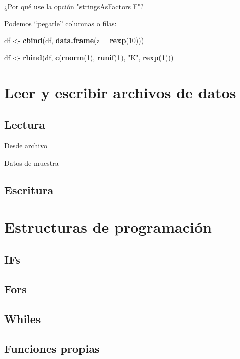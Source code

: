 \documentclass[]{article}
\newenvironment{Shaded}{\begin{snugshade}}{\end{snugshade}}
\newcommand{\KeywordTok}[1]{\textcolor[rgb]{0.13,0.29,0.53}{\textbf{{#1}}}}
\newcommand{\DataTypeTok}[1]{\textcolor[rgb]{0.13,0.29,0.53}{{#1}}}
\newcommand{\DecValTok}[1]{\textcolor[rgb]{0.00,0.00,0.81}{{#1}}}
\newcommand{\StringTok}[1]{\textcolor[rgb]{0.31,0.60,0.02}{{#1}}}
\newcommand{\NormalTok}[1]{{#1}}
\begin{document}
\begin{curiosidad}
¿Por qué use la opción "stringsAsFactors \= F"?
\end{curiosidad}

Podemos ``pegarle'' columnas o filas:

\begin{Shaded}
\begin{Highlighting}[]
\NormalTok{df <-}\StringTok{ }\KeywordTok{cbind}\NormalTok{(df, }\KeywordTok{data.frame}\NormalTok{(}\DataTypeTok{z =} \KeywordTok{rexp}\NormalTok{(}\DecValTok{10}\NormalTok{)))}

\NormalTok{df <-}\StringTok{ }\KeywordTok{rbind}\NormalTok{(df, }\KeywordTok{c}\NormalTok{(}\KeywordTok{rnorm}\NormalTok{(}\DecValTok{1}\NormalTok{), }\KeywordTok{runif}\NormalTok{(}\DecValTok{1}\NormalTok{), }\StringTok{"K"}\NormalTok{, }\KeywordTok{rexp}\NormalTok{(}\DecValTok{1}\NormalTok{)))}
\end{Highlighting}
\end{Shaded}

\section{Leer y escribir archivos de
datos}\label{leer-y-escribir-archivos-de-datos}

\subsection{Lectura}\label{lectura}

Desde archivo

Datos de muestra

\subsection{Escritura}\label{escritura}

\section{Estructuras de programación}\label{estructuras-de-programacion}

\subsection{IFs}\label{ifs}

\subsection{Fors}\label{fors}

\subsection{Whiles}\label{whiles}

\subsection{Funciones propias}\label{funciones-propias}

\printbibliography
\end{document}

